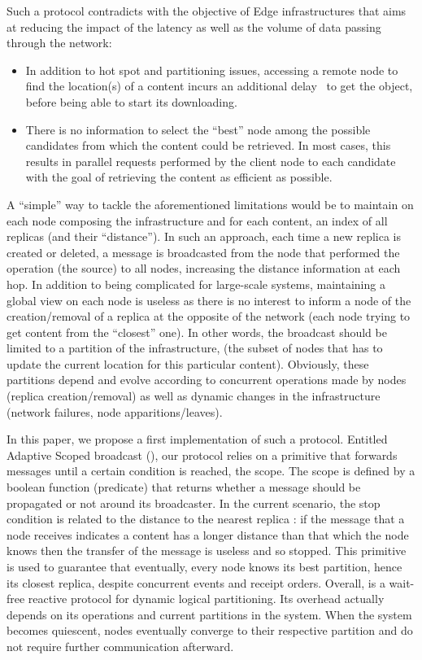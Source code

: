 Such a protocol contradicts with the objective of Edge
infrastructures that aims at reducing the impact of the
latency as well as the volume of data passing through the network:
\begin{itemize}
  \item In addition to hot spot and partitioning issues, accessing a
    remote node to find the location(s) of a content incurs an
    additional delay~\cite{asrese2019measuring, doan2019tracing} to
    get the object, before being able to start its downloading.
  \item There is no information to select the ``best'' node among the
     possible candidates from which the content  could be
     retrieved. In most cases, this results in parallel requests performed by the client node to
     each candidate with the goal of retrieving the content as efficient
     as possible.
\end{itemize}    

A ``simple'' way to tackle the aforementioned limitations would be to
maintain on each node composing the infrastructure and for each
content, an index of all replicas (and their ``distance'').  In such
an approach, each time a new replica is created or deleted, a message
is broadcasted from the node that performed the operation (\ie the
source) to all nodes, increasing the distance information at each hop.
%
In addition to being complicated for large-scale systems, maintaining
a global view on each node is useless as there is no interest to
inform a node of the creation/removal of a replica at the opposite of
the network (each node trying to get content from the ``closest''
one).  In other words, the broadcast should be limited to a partition
of the infrastructure, (\ie the subset of nodes that has to update the
current location for this particular content). Obviously, these
partitions depend and evolve according to concurrent operations made
by nodes (replica creation/removal) as well as dynamic changes in the
infrastructure (network failures, node apparitions/leaves).

In this paper, we propose a first implementation of such a protocol.
Entitled Adaptive Scoped broadcast (\NAME), 
our protocol relies on a primitive that forwards
messages until a certain condition is reached, \ie the scope. The
scope is defined by a boolean function (predicate) that returns
whether a message should be propagated or not around its
broadcaster. In the current scenario, the stop condition is related to
the distance to the nearest replica : if the message that a node receives
indicates a content has a longer distance than that which the node
knows then the transfer of the message is useless and so stopped.
%
This primitive is used to guarantee that eventually, every node knows
its best partition, hence its closest replica, despite concurrent
events and receipt orders. Overall, \NAME is a wait-free reactive protocol for
dynamic logical partitioning.  Its overhead actually depends on
its operations and current partitions in the system. When the system
becomes quiescent, nodes eventually converge to their respective
partition and do not require further communication afterward.

